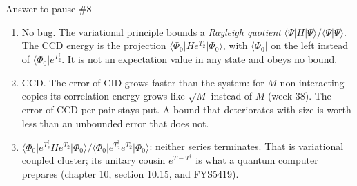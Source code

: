 \documentclass[aspectratio=169,10pt]{beamer}
\newcounter{thinkctr}
\newcommand{\thinka}[1]{%
  \vfill
  \begin{tcolorbox}[enhanced,colback=paleteal,colframe=teal,boxrule=1.2pt,arc=4pt,
    grow to left by=6mm,grow to right by=6mm,
    left=16pt,right=16pt,top=16pt,bottom=18pt,
    fonttitle=\bfseries\Large,fontupper=\large,
    title={Answer to pause \#\thethinkctr}]
  #1
  \end{tcolorbox}
  \vfill}
\newcommand{\bra}[1]{\langle #1\vert}
\newcommand{\mel}[3]{\langle #1\lvert #2\rvert #3\rangle}
\newcommand{\ph}{\Phi_0}
\begin{document}
\begin{frame}{Answer to pause \#8}
\thinka{%
\begin{enumerate}
\item No bug. The variational principle bounds a \emph{Rayleigh quotient} $\langle\Psi|H|\Psi\rangle/\langle\Psi|\Psi\rangle$. The CCD energy is the projection $\mel{\ph}{He^{T_2}}{\ph}$, with $\bra{\ph}$ on the left instead of $\bra{\ph}e^{T_2^\dagger}$. It is not an expectation value in any state and obeys no bound.
\item CCD. The error of CID grows faster than the system: for $M$ non-interacting copies its correlation energy grows like $\sqrt M$ instead of $M$ (week 38). The error of CCD per pair stays put. A bound that deteriorates with size is worth less than an unbounded error that does not.
\item $\mel{\ph}{e^{T_2^\dagger}He^{T_2}}{\ph}/\mel{\ph}{e^{T_2^\dagger}e^{T_2}}{\ph}$: neither series terminates. That is variational coupled cluster; its unitary cousin $e^{T-T^\dagger}$ is what a quantum computer prepares (chapter 10, section 10.15, and FYS5419).
\end{enumerate}}
\end{frame}
\end{document}
